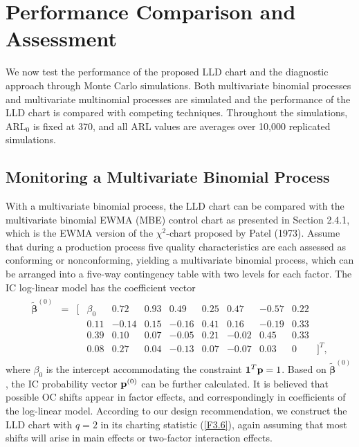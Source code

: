 \section{Performance Comparison and Assessment}\label{sec3.6}

We now test the performance of the proposed LLD chart and the diagnostic approach
through Monte Carlo simulations. Both multivariate binomial processes and
multivariate multinomial processes are simulated and the performance of the LLD
chart is compared with competing techniques. Throughout the simulations, ARL$_0$ is
fixed at 370, and all ARL values are averages over 10,000 replicated simulations.

\subsection{Monitoring a Multivariate Binomial Process}

With a multivariate binomial process, the LLD chart can be compared with the
multivariate binomial EWMA (MBE) control chart as presented in Section 2.4.1, which
is the EWMA version of the $\chi^2$-chart proposed by Patel (1973). Assume that
during a production process five quality characteristics are each assessed as
conforming or nonconforming, yielding a multivariate binomial process, which can be
arranged into a five-way contingency table with two levels for each factor. The IC
log-linear model has the coefficient vector
\begin{eqnarray}
\begin{array}{rrrrrrrrrrrl}
\widetilde{\bm{\beta}}^{(0)} & = & [ & \beta_0 & 0.72 & 0.93
& 0.49 & 0.25 & 0.47 & -0.57 & 0.22 & \\
& & & 0.11 & -0.14 & 0.15 & -0.16 & 0.41 & 0.16 & -0.19 & 0.33 & \\
& & & 0.39 & 0.10 & 0.07 & -0.05 & 0.21 & -0.02 & 0.45 & 0.33 & \\
& & & 0.08 & 0.27 & 0.04 & -0.13 & 0.07 & -0.07 & 0.03 & 0 & ]^T,
\end{array}
\nonumber
\end{eqnarray}
where $\beta_0$ is the intercept accommodating the constraint $\boldsymbol1^T{\bf p}=1$.
Based on $\widetilde{\bm{\beta}}^{(0)}$, the IC probability vector ${\bf p}^{(0)}$
can be further calculated. It is believed that possible OC shifts appear in factor
effects, and correspondingly in coefficients of the log-linear model. According to
our design recommendation, we construct the LLD chart with $q=2$ in its charting
statistic (\ref{F3.6}), again assuming that most shifts will arise in main effects
or two-factor interaction effects.


